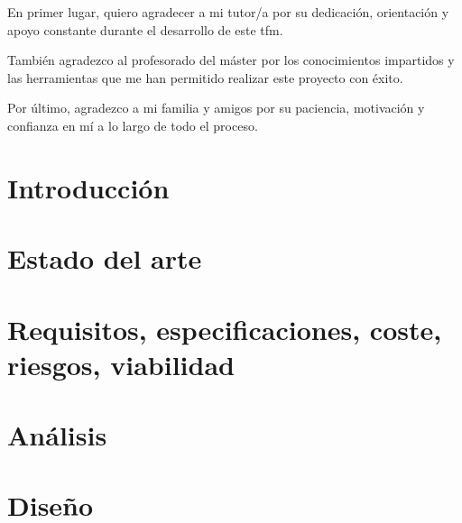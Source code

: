 \documentclass[twoside,english,a4paper,12pt]{plantilla/twcam-tfm-doc}
\begin{document}
\begin{agradecimientos}
  En primer lugar, quiero agradecer a mi tutor/a por su dedicación, orientación y apoyo constante durante el desarrollo de este \gls{tfm}.

  También agradezco al profesorado del máster por los conocimientos impartidos y las herramientas que me han permitido realizar este proyecto con éxito. 

  Por último, agradezco a mi familia y amigos por su paciencia, motivación y confianza en mí a lo largo de todo el proceso.
\end{agradecimientos}

\cleardoublepage

\tableofcontents
\cleardoublepage
\listoffigures
\cleardoublepage
\listoftables
\cleardoublepage
\lstlistoflistings

\pagestyle{twcam}
\justify



\chapter{Introducción}


\chapter{Estado del arte}\label{ch:estado-arte}


\chapter{Requisitos, especificaciones, coste, riesgos, viabilidad}\label{ch:requisitos}


\chapter{Análisis}


\chapter{Diseño}

\end{document}

